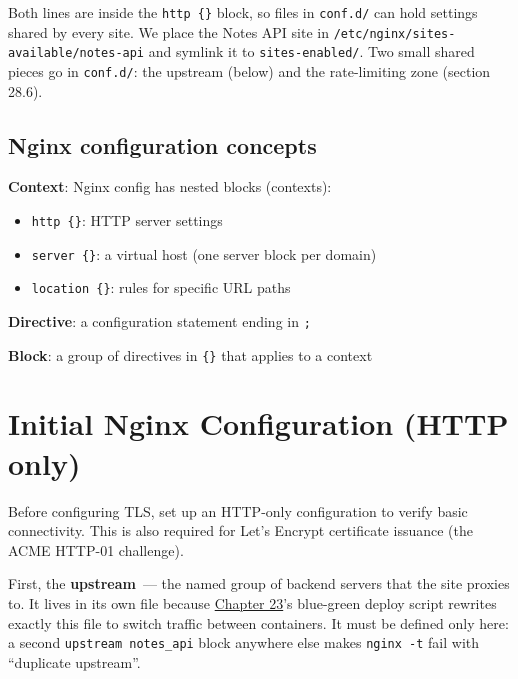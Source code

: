 \noindent{}Both lines are inside the \texttt{http\ \{\}} block, so files in \texttt{conf.d/} can hold settings shared by every site. We place the Notes API site in \texttt{/}\allowbreak{}\texttt{etc/}\allowbreak{}\texttt{nginx/}\allowbreak{}\texttt{sites-}\allowbreak{}\texttt{available/}\allowbreak{}\texttt{notes-}\allowbreak{}\texttt{api} and symlink it to \texttt{sites-enabled/}. Two small shared pieces go in \texttt{conf.d/}: the upstream (below) and the rate-limiting zone (section 28.6).

\subsection*{Nginx configuration concepts}\label{28-traffic-routing:nginx-configuration-concepts}

\textbf{Context}: Nginx config has nested blocks (contexts):

\begin{itemize}
\tightlist
\item
  \texttt{http\ \{\}}: HTTP server settings
\item
  \texttt{server\ \{\}}: a virtual host (one server block per domain)
\item
  \texttt{location\ \{\}}: rules for specific URL paths
\end{itemize}

\noindent{}\textbf{Directive}: a configuration statement ending in \texttt{;}

\textbf{Block}: a group of directives in \texttt{\{\}} that applies to a context

\setcounter{section}{3}
\section{Initial Nginx Configuration (HTTP only)}\label{28-traffic-routing:284-initial-nginx-configuration-http-only}

Before configuring TLS, set up an HTTP-only configuration to verify basic connectivity. This is also required for Let's Encrypt certificate issuance (the ACME HTTP-01 challenge).

First, the \textbf{upstream}~--- the named group of backend servers that the site proxies to. It lives in its own file because \hyperref[ch:23-code-transfer]{Chapter 23}'s blue-green deploy script rewrites exactly this file to switch traffic between containers. It must be defined only here: a second \texttt{upstream\ notes\_api} block anywhere else makes \texttt{nginx\ -t} fail with ``duplicate upstream''.

